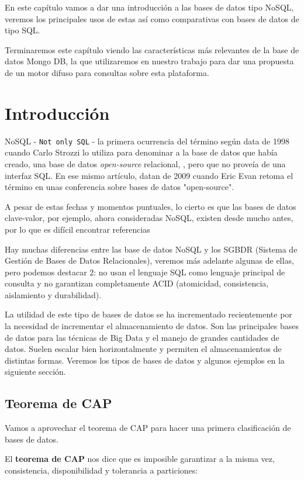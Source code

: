 En este capítulo vamos a dar una introducción a las bases de datos tipo NoSQL, veremos los principales usos de estas así como comparativas con bases de datos de tipo SQL.

Terminaremos este capítulo viendo las características más relevantes de la base de datos Mongo DB, la que utilizaremos en nuestro trabajo para dar una propuesta de un motor difuso para consultas sobre esta plataforma.

\section{Introducción}
NoSQL - \texttt{Not only SQL} - la primera ocurrencia del término  según \cite{chalmerthesis} data de 1998 cuando Carlo Strozzi lo utiliza para denominar a la base de datos que había creado, una base de datos \textit{open-source} relacional, \cite{strozzidb}, pero que no proveía de una interfaz SQL. En ese mismo artículo, datan de 2009 cuando Eric Evan retoma el término en unas conferencia sobre bases de datos "open-source".

A pesar de estas fechas y momentos puntuales, lo cierto es que las bases de datos clave-valor, por ejemplo, ahora consideradas NoSQL, existen desde mucho antes, por lo que es difícil encontrar referencias 

Hay muchas diferencias entre las base de datos NoSQL y los SGBDR (Sistema de Gestión de Bases de Datos Relacionales), veremos más adelante algunas de ellas, pero podemos destacar 2: no usan el lenguaje SQL como lenguaje principal de consulta y no garantizan completamente ACID (atomicidad, consistencia, aislamiento y durabilidad). 

La utilidad de este tipo de bases de datos se ha incrementado recientemente por la necesidad de incrementar el almacenamiento de datos. Son las principales bases de datos para las técnicas de Big Data y el manejo de grandes cantidades de datos. Suelen escalar bien horizontalmente y permiten el almacenamientos de distintas formas. Veremos los tipos de bases de datos y algunos ejemplos en la siguiente sección.

\subsection{Teorema de CAP}
Vamos a aprovechar el teorema de CAP \cite{captheorem} para hacer una primera clasificación de bases de datos.

El \textbf{teorema de CAP} nos dice que es imposible garantizar a la misma vez, consistencia, disponibilidad y tolerancia a particiones:

